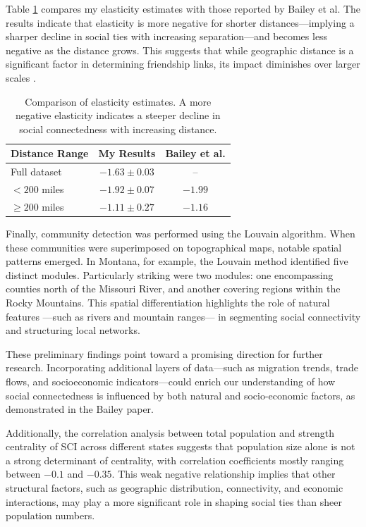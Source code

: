 Table \ref{tab:elasticity_comparison} compares my elasticity estimates with those reported by Bailey et al. The results indicate that elasticity is more negative for shorter distances—implying a sharper decline in social ties with increasing separation—and becomes less negative as the distance grows. This suggests that while geographic distance is a significant factor in determining friendship links, its impact diminishes over larger scales \cite{Bailey2018}.

\begin{table}[h]
    \centering
    \begin{tabular}{lcc}
        \hline
        Distance Range & My Results & Bailey et al. \\ 
        \hline
        Full dataset & $-1.63 \pm 0.03$ & -- \\ 
        $< 200$ miles & $-1.92 \pm 0.07$ & $-1.99$ \\ 
        $\geq 200$ miles & $-1.11 \pm 0.27$ & $-1.16$ \\ 
        \hline
    \end{tabular}
    \caption{Comparison of elasticity estimates. A more negative elasticity indicates a steeper decline in social connectedness with increasing distance.}
    \label{tab:elasticity_comparison}
\end{table}

Finally, community detection was performed using the Louvain algorithm. When these communities were superimposed on topographical maps, notable spatial patterns emerged. In Montana, for example, the Louvain method identified five distinct modules. Particularly striking were two modules: one encompassing counties north of the Missouri River, and another covering regions within the Rocky Mountains. This spatial differentiation highlights the role of natural features —such as rivers and mountain ranges— in segmenting social connectivity and structuring local networks.

These preliminary findings point toward a promising direction for further research. Incorporating additional layers of data—such as migration trends, trade flows, and socioeconomic indicators—could enrich our understanding of how social connectedness is influenced by both natural and socio-economic factors, as demonstrated in the Bailey paper. 

Additionally, the correlation analysis between total population and strength centrality of SCI across different states suggests that population size alone is not a strong determinant of centrality, with correlation coefficients mostly ranging between $-0.1$ and $-0.35$. This weak negative relationship implies that other structural factors, such as geographic distribution, connectivity, and economic interactions, may play a more significant role in shaping social ties than sheer population numbers. 

